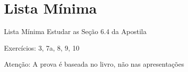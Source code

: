 \section{Lista Mínima}

\begin{frame}{Lista Mínima}
  Estudar as Seção 6.4 da Apostila

  \vspace{\baselineskip}
  Exercícios: 3, 7a, 8, 9, 10

  \vfill
  Atenção: A prova é baseada no livro, não nas apresentações
\end{frame}


